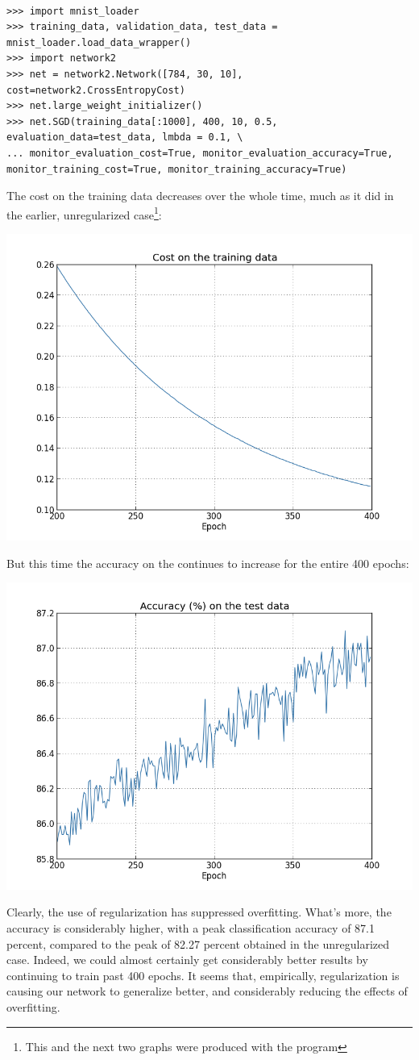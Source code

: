 \documentclass[a4paper,twoside,10pt]{book}
\begin{document}
\begin{lstlisting}

>>> import mnist_loader 
>>> training_data, validation_data, test_data =  mnist_loader.load_data_wrapper() 
>>> import network2 
>>> net = network2.Network([784, 30, 10], cost=network2.CrossEntropyCost)
>>> net.large_weight_initializer()
>>> net.SGD(training_data[:1000], 400, 10, 0.5, evaluation_data=test_data, lmbda = 0.1, \
... monitor_evaluation_cost=True, monitor_evaluation_accuracy=True, monitor_training_cost=True, monitor_training_accuracy=True)

\end{lstlisting}
The cost on the training data decreases over the whole time, much as it did in the earlier, unregularized case\footnote{This and the next two graphs were produced with the program }:
\begin{center}
	\includegraphics[width=0.7\linewidth]{figures/ch3/regularized1}
\end{center}
But this time the accuracy on the  continues to increase for the entire 400 epochs:
\begin{center}
	\includegraphics[width=0.7\linewidth]{figures/ch3/regularized2}
\end{center}
Clearly, the use of regularization has suppressed overfitting. What's more, the accuracy is considerably higher, with a peak classification accuracy of 87.1 percent, compared to the peak of 82.27 percent obtained in the unregularized case. Indeed, we could almost certainly get considerably better results by continuing to train past 400 epochs. It seems that, empirically, regularization is causing our network to generalize better, and considerably reducing the effects of overfitting.
\end{document}
